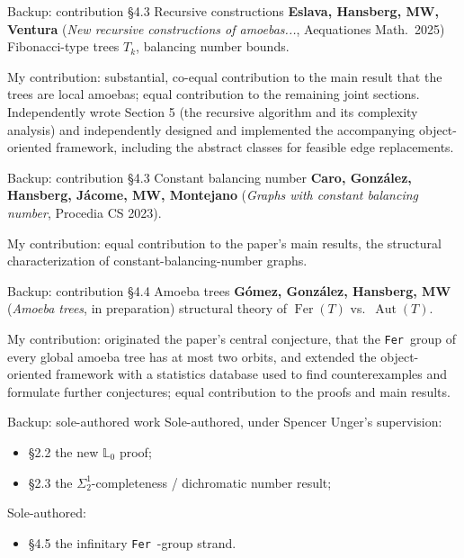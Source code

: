 \documentclass[aspectratio=169]{beamer}
\DeclareMathOperator{\Fer}{Fer}
\DeclareMathOperator{\Aut}{Aut}
\newcommand{\tFer}{\texttt{Fer}\ }
\begin{document}
\begin{frame}{Backup: contribution \S4.3 Recursive constructions}
  \textbf{Eslava, Hansberg, MW, Ventura} (\emph{New recursive constructions of amoebas...}, Aequationes Math.\ 2025) Fibonacci-type trees $T_k$, balancing number bounds.
  \vspace{0.5em}

  My contribution: substantial, co-equal contribution to the main result that the trees are local amoebas; equal contribution to the remaining joint sections. Independently wrote Section 5 (the recursive algorithm and its complexity analysis) and independently designed and implemented the accompanying object-oriented framework, including the abstract classes for feasible edge replacements.
\end{frame}

\begin{frame}{Backup: contribution \S4.3 Constant balancing number}
  \textbf{Caro, Gonz\'alez, Hansberg, J\'acome, MW, Montejano} (\emph{Graphs with constant balancing number}, Procedia CS 2023).
  \vspace{0.5em}

  My contribution: equal contribution to the paper's main results, the structural characterization of constant-balancing-number graphs.
\end{frame}

\begin{frame}{Backup: contribution \S4.4 Amoeba trees}
  \textbf{G\'omez, Gonz\'alez, Hansberg, MW} (\emph{Amoeba trees}, in preparation) structural theory of $\Fer(T)$ vs.\ $\Aut(T)$.
  \vspace{0.5em}

  My contribution: originated the paper's central conjecture, that the \tFer group of every global amoeba tree has at most two orbits, and extended the object-oriented framework with a statistics database used to find counterexamples and formulate further conjectures; equal contribution to the proofs and main results.
\end{frame}

\begin{frame}{Backup: sole-authored work}
  Sole-authored, under Spencer Unger's supervision:
  \begin{itemize}
    \item \S2.2 the new $\mathbb L_0$ proof;
    \item \S2.3 the $\Sigma^1_2$-completeness / dichromatic number result;
  \end{itemize}
  \vspace{0.5em}
  Sole-authored:
  \begin{itemize}
    \item \S4.5 the infinitary \tFer-group strand.
  \end{itemize}
\end{frame}
\end{document}
